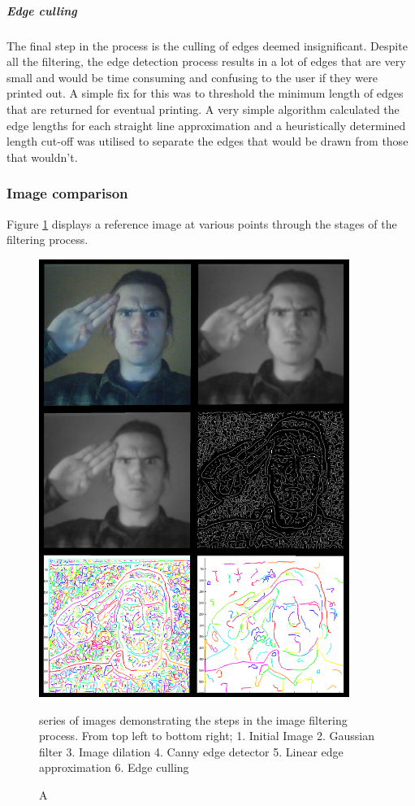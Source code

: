 \subparagraph{Edge culling}
The final step in the process is the culling of edges deemed insignificant. Despite all the filtering, the edge detection process results in a lot of edges that are very small and would be time consuming and confusing to the user if they were printed out. A simple fix for this was to threshold the minimum length of edges that are returned for eventual printing. A very simple algorithm calculated the edge lengths for each straight line approximation and a heuristically determined length cut-off was utilised to separate the edges that would be drawn from those that wouldn't.

\subsubsection{Image comparison}
Figure \ref{fig:demo} displays a reference image at various points through the stages of the filtering process.

\begin{figure}
\centering
\includegraphics[width=0.9\textwidth]{figures/systemDesign/demo.png}
\caption[Image filtering process] A series of images demonstrating the steps in the image filtering process. From top left to bottom right; 1. Initial Image 2. Gaussian filter 3. Image dilation 4. Canny edge detector 5. Linear edge approximation 6. Edge culling {
\label{fig:demo}}
\end{figure}
